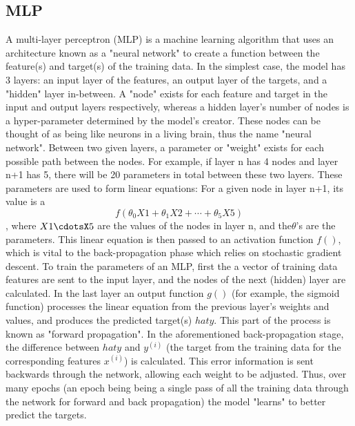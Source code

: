 \documentclass[12pt, a4]{article} %
\begin{document}
\subsection{MLP}
A multi-layer perceptron (MLP) is a machine learning algorithm that uses an architecture known as a "neural network" to create a function between the feature(s) and
target(s) of the training data.  In the simplest case, the model has 3 layers: an input layer of the features, an output layer of the targets, and a "hidden" layer in-between.  A "node" exists for each feature and target in the input and output layers respectively, whereas a hidden layer's number of nodes is a hyper-parameter determined by the model's creator.  These nodes can be thought of as being like neurons in a living brain, thus the name "neural network".  Between two given layers, a parameter or "weight" exists for each possible path between the nodes.  For example, if layer n has 4 nodes and layer n+1 has 5, there will be 20 parameters in total between these two layers.  These parameters are used to form linear equations: For a given node in layer n+1, its value is a \[f(\theta_0X1 + \theta_1X2 + \cdots + \theta_5X5)\], where \(X1\cdotsX5\) are the values of the nodes in layer n, and the\(\theta\)'s are the parameters.  This linear equation is then passed to an activation function \(f()\), which is vital to the back-propagation phase which relies on stochastic gradient descent.  To train the parameters of an MLP, first the a vector of training data features are sent to the input layer, and the nodes of the next (hidden) layer are calculated.  In the last layer an output function \(g()\) (for example, the sigmoid function) processes the linear equation from the previous layer's weights and values, and produces the predicted target(s) \(hat{y}\). This part of the process is known as "forward propagation".  In the aforementioned back-propagation stage, the difference between \(hat{y}\) and \(y^{(i)}\) (the target from the training data for the corresponding features \(x^{(i)}\)) is calculated. This error information is sent backwards through the network, allowing each weight to be adjusted.  Thus, over many epochs (an epoch being being a single pass of all the training data through the network for forward and back propagation) the model "learns" to better predict the targets.   
\end{document}
